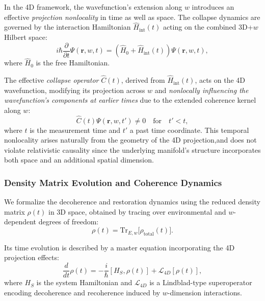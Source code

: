 \documentclass[12pt]{article}
\begin{document}
In the 4D framework, the wavefunction’s extension along \(w\) introduces an effective \emph{projection nonlocality} in time as well as space. The collapse dynamics are governed by the interaction Hamiltonian \(\hat{H}_{\mathrm{int}}(t)\) acting on the combined 3D+\(w\) Hilbert space:
\begin{equation}
i \hbar \frac{\partial}{\partial t} \Psi(\mathbf{r}, w, t) = \left( \hat{H}_0 + \hat{H}_{\mathrm{int}}(t) \right) \Psi(\mathbf{r}, w, t),
\label{eq:schrodinger_4d_interaction}
\end{equation}
where \(\hat{H}_0\) is the free Hamiltonian.

The effective \emph{collapse operator} \(\hat{C}(t)\), derived from \(\hat{H}_{\mathrm{int}}(t)\), acts on the 4D wavefunction, modifying its projection across \(w\) and \emph{nonlocally influencing the wavefunction's components at earlier times} due to the extended coherence kernel along \(w\):
\begin{equation}
\hat{C}(t) \Psi(\mathbf{r}, w, t') \neq 0 \quad \text{for} \quad t' < t,
\label{eq:nonlocal_collapse}
\end{equation}
where \(t\) is the measurement time and \(t'\) a past time coordinate. This temporal nonlocality arises naturally from the geometry of the 4D projection,and does not violate relativistic causality since the underlying manifold's structure incorporates both space and an additional spatial dimension.

\subsubsection*{Density Matrix Evolution and Coherence Dynamics}

We formalize the decoherence and restoration dynamics using the reduced density matrix \(\rho(t)\) in 3D space, obtained by tracing over environmental and \(w\)-dependent degrees of freedom:
\begin{equation}
\rho(t) = \mathrm{Tr}_{E,w} \big[ \rho_{\mathrm{total}}(t) \big].
\label{eq:reduced_density_matrix}
\end{equation}

Its time evolution is described by a master equation incorporating the 4D projection effects:
\begin{equation}
\frac{d}{dt} \rho(t) = -\frac{i}{\hbar} \left[ H_S, \rho(t) \right] + \mathcal{L}_{4D}[\rho(t)],
\label{eq:master_equation_4d}
\end{equation}
where \(H_S\) is the system Hamiltonian and \(\mathcal{L}_{4D}\) is a Lindblad-type superoperator encoding decoherence and recoherence induced by \(w\)-dimension interactions.
\end{document}
